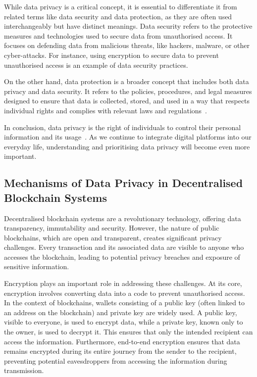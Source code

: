 While data privacy is a critical concept, it is essential to differentiate it from related terms like data security and data protection, as they are often used interchangeably but have distinct meanings.
Data security refers to the protective measures and technologies used to secure data from unauthorised access. It focuses on defending data from malicious threats, like hackers, malware, or other cyber-attacks. For instance, using encryption to secure data to prevent unauthorised access is an example of data security practices.

On the other hand, data protection is a broader concept that includes both data privacy and data security. It refers to the policies, procedures, and legal measures designed to ensure that data is collected, stored, and used in a way that respects individual rights and complies with relevant laws and regulations~\cite{Covert.2020}. 

In conclusion, data privacy is the right of individuals to control their personal information and its usage~\cite{Covert.2020}. As we continue to integrate digital platforms into our everyday life, understanding and prioritising data privacy will become even more important.

\subsection{Mechanisms of Data Privacy in Decentralised Blockchain Systems}
Decentralised blockchain systems are a revolutionary technology, offering data transparency, immutability and security. However, the nature of public blockchains, which are open and transparent, creates significant privacy challenges. Every transaction and its associated data are visible to anyone who accesses the blockchain, leading to potential privacy breaches and exposure of sensitive information.

Encryption plays an important role in addressing these challenges. At its core, encryption involves converting data into a code to prevent unauthorised access. In the context of blockchains, wallets consisting of a public key (often linked to an address on the blockchain) and private key are widely used. A public key, visible to everyone, is used to encrypt data, while a private key, known only to the owner, is used to decrypt it. This ensures that only the intended recipient can access the information. Furthermore, end-to-end encryption ensures that data remains encrypted during its entire journey from the sender to the recipient, preventing potential eavesdroppers from accessing the information during transmission.


